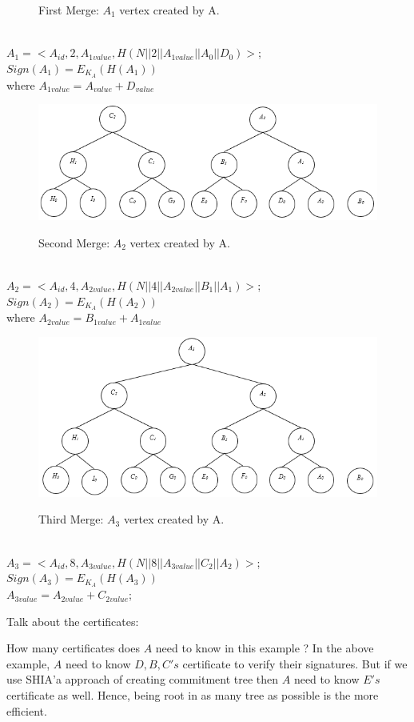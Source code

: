 \begin{exmp}
\begin{figure}[hp]
					\caption{First Merge: $A_{1}$ vertex created by A.}
					\label{fig:commitment-tree-example-2}
				\end{figure}\\
				$A_{1} = <A_{id}, 2, A_{1value}, H(N||2||A_{1value}||A_{0}||D_{0})>$; $Sign(A_{1}) = E_{K_{A}}(H(A_{1}))$\\
				where $A_{1value} = A_{value} + D_{value} $
				\begin{figure}[hp]
					\centering
					\includegraphics[scale = 1]{images/commitment-tree-example-3.png}\\
					\caption{Second Merge: $A_{2}$ vertex created by A.}
					\label{fig:commitment-tree-example-3}
				\end{figure}\\
				$A_{2} = <A_{id}, 4, A_{2value}, H(N||4||A_{2value}||B_{1}||A_{1}) >$; $Sign(A_{2}) = E_{K_{A}}(H({A_{2}}))$\\
				where $A_{2value} = B_{1value} + A_{1value} $
				\begin{figure}[hp]
					\centering
					\includegraphics[scale = 1]{images/commitment-tree-example-4.png}\\
					\caption{Third Merge: $A_{3}$ vertex created by A.}
					\label{fig:commitment-tree-example-4}
				\end{figure}\\
				$A_{3} = <A_{id},8, A_{3value},H(N||8||A_{3value}||C_{2}||A_{2})>$; $Sign(A_{3}) = E_{K_{A}}(H(A_{3}))$\\
				$A_{3value} = A_{2value} + C_{2value}$;
			\end{exmp}

Talk about the certificates:
	
	How many certificates does $A$ need to know in this example ?
	In the above example, $A$ need to know $D,B,C's$ certificate to verify their signatures.
	But if we use SHIA'a approach of creating commitment tree then $A$ need to know $E's$ certificate as well.
	Hence, being root in as many tree as possible is the more efficient.
	
